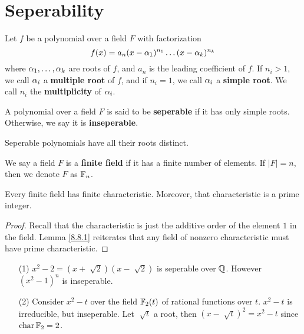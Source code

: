 \section{Seperability}
\label{section_8.6}

\begin{definition}
  Let $f$ be a polynomial over a field  $F$ with factorization
  \begin{equation*}
    f(x)=a_n(x-\alpha_1)^{n_1} \dots (x-\alpha_k)^{n_k}
  \end{equation*}
  where $\alpha_1, \dots, \alpha_k$ are roots of $f$, and $a_n$ is the leading
  coefficient of $f$. If $n_i>1$, we call  $\alpha_i$ a  \textbf{multiple root} of
  $f$, and if  $n_i=1$, we call  $\alpha_i$ a  \textbf{simple root}. We call $n_i$
  the  \textbf{multiplicity} of $\alpha_i$.
\end{definition}

\begin{definition}
  A polynomial over a field $F$ is said to be  \textbf{seperable} if it has
  only simple roots. Otherwise, we say it is \textbf{inseperable}.
\end{definition}

\begin{lemma}\label{lemma_8.6.1}
  Seperable polynomials have all their roots distinct.
\end{lemma}

\begin{definition}
  We say a field $F$ is a \textbf{finite field} if it has a finite number of
  elements. If $|F|=n$, then we denote $F$ as $\mathbb{F}_n$.
\end{definition}

\begin{lemma}\label{lemma_8.6.2}
  Every finite field has finite characteristic. Moreover, that characteristic
  is a prime integer.
\end{lemma}
\begin{proof}
  Recall that the characteristic is just the additive order of the element $1$
  in the field. Lemma \ref{8.8.1} reiterates that any field of nonzero
  characteristic must have prime characteristic.
\end{proof}

\begin{example}\label{example_8.14}
  \begin{enumerate}
    \item[(1)] $x^2-2=(x+\sqrt[]{2})(x-\sqrt[]{2})$ is seperable over $\mathbb{Q}$.
      However  $(x^2-1)^n$ is inseperable.

    \item[(2)] Consider $x^2-t$ over the field  $\mathbb{F}_2(t)$ of rational
      functions over $t$.  $x^2-t$ is irreducible, but inseperable. Let
      $\sqrt[]{t}$ a root, then $(x-\sqrt[]{t})^2=x^2-t$ since
      $\operatorname{char}{\mathbb{F}_2}=2$.
  \end{enumerate}
\end{example}

